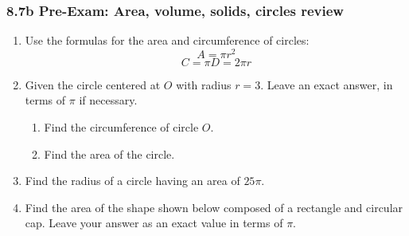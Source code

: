 \documentclass[12pt, twoside]{article}
\begin{document}
\subsubsection*{8.7b Pre-Exam: Area, volume, solids, circles review}
 \begin{enumerate}

  \item Use the formulas for the area and circumference of circles:
  \[A=\pi r^2\]
  \[C=\pi D = 2\pi r\]
  
  \item Given the circle centered at $O$ with radius $r=3$. Leave an exact answer, in terms of $\pi$ if necessary.
  \begin{multicols}{2}
    \begin{enumerate}
      \item Find the circumference of circle $O$. %
      \item Find the area of the circle.\vspace{2cm}
    \end{enumerate}
  \end{multicols}

  \item Find the radius of a circle having an area of $25 \pi$. \vspace{2cm}
  
  \item Find the area of the shape shown below composed of a rectangle and circular cap. Leave your answer as an exact value in terms of $\pi$.
    \begin{flushright}
  \end{flushright}\vspace{1cm}


\end{enumerate}
\end{document}
